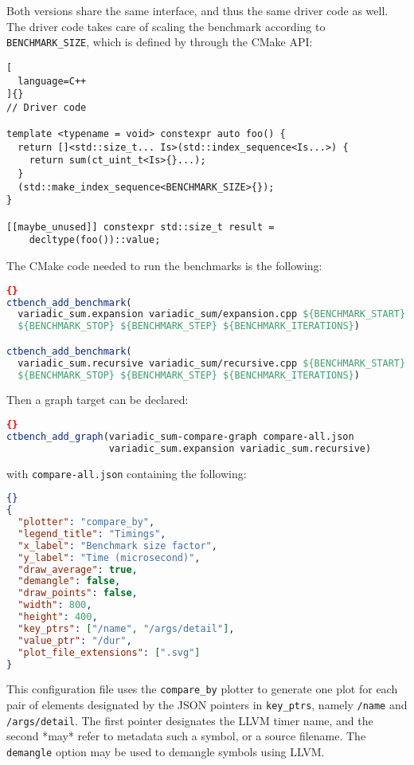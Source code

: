 \documentclass[../main]{subfiles}
\begin{document}
Both versions share the same interface, and thus the same driver code as well.
The driver code takes care of scaling the benchmark according to
\lstinline{BENCHMARK_SIZE}, which is defined by \ctbench through the CMake API:

\begin{lstlisting}[
  language=C++
]{}
// Driver code

template <typename = void> constexpr auto foo() {
  return []<std::size_t... Is>(std::index_sequence<Is...>) {
    return sum(ct_uint_t<Is>{}...);
  }
  (std::make_index_sequence<BENCHMARK_SIZE>{});
}

[[maybe_unused]] constexpr std::size_t result =
    decltype(foo())::value;
\end{lstlisting}

The CMake code needed to run the benchmarks is the following:

\begin{lstlisting}[language=CMake]{}
ctbench_add_benchmark(
  variadic_sum.expansion variadic_sum/expansion.cpp ${BENCHMARK_START}
  ${BENCHMARK_STOP} ${BENCHMARK_STEP} ${BENCHMARK_ITERATIONS})

ctbench_add_benchmark(
  variadic_sum.recursive variadic_sum/recursive.cpp ${BENCHMARK_START}
  ${BENCHMARK_STOP} ${BENCHMARK_STEP} ${BENCHMARK_ITERATIONS})
\end{lstlisting}

Then a graph target can be declared:

\begin{lstlisting}[language=CMake]{}
ctbench_add_graph(variadic_sum-compare-graph compare-all.json
                  variadic_sum.expansion variadic_sum.recursive)
\end{lstlisting}

with \lstinline{compare-all.json} containing the following:

\begin{lstlisting}[language=JSON]{}
{
  "plotter": "compare_by",
  "legend_title": "Timings",
  "x_label": "Benchmark size factor",
  "y_label": "Time (microsecond)",
  "draw_average": true,
  "demangle": false,
  "draw_points": false,
  "width": 800,
  "height": 400,
  "key_ptrs": ["/name", "/args/detail"],
  "value_ptr": "/dur",
  "plot_file_extensions": [".svg"]
}
\end{lstlisting}

This configuration file uses the \lstinline{compare_by} plotter to generate one
plot for each pair of elements designated by the JSON pointers in
\lstinline{key_ptrs}, namely \lstinline{/name} and \lstinline{/args/detail}. The
first pointer designates the LLVM timer name, and the second *may* refer to
metadata such a \cpp symbol, or a \cpp source filename. The \lstinline{demangle}
option may be used to demangle \cpp symbols using LLVM.
\end{document}

